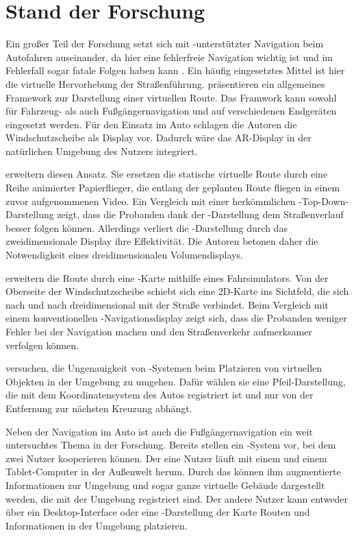 \chapter{Stand der Forschung}
\label{chap:related_work}
Ein großer Teil der Forschung setzt sich mit -unterstützter Navigation beim Autofahren auseinander, da hier eine fehlerfreie Navigation wichtig ist und im Fehlerfall sogar fatale Folgen haben kann \parencite{Lin2017}.
Ein häufig eingesetztes Mittel ist hier die virtuelle Hervorhebung der Straßenführung.
\textcite{Narzt2006} präsentieren ein allgemeines Framework zur Darstellung einer virtuellen Route.
Das Framwork kann sowohl für Fahrzeug- als auch Fußgängernavigation und auf verschiedenen Endgeräten eingesetzt werden.
Für den Einsatz im Auto schlagen die Autoren die Windschutzscheibe als Display vor.
Dadurch wäre das AR-Display in der natürlichen Umgebung des Nutzers integriert.

\textcite{Bark2014} erweitern diesen Ansatz.
Sie ersetzen die statische virtuelle Route durch eine Reihe animierter Papierflieger, die entlang der geplanten Route fliegen in einem zuvor aufgenommenen Video.
Ein Vergleich mit einer herkömmlichen -Top-Down-Darstellung zeigt, dass die Probanden dank der -Darstellung dem Straßenverlauf besser folgen können.
Allerdings verliert die -Darstellung durch das zweidimensionale Display ihre Effektivität.
Die Autoren betonen daher die Notwendigkeit eines dreidimensionalen Volumendisplays.

\textcite{Kim2009} erweitern die Route durch eine -Karte mithilfe eines Fahrsimulators.
Von der Oberseite der Windschutzscheibe schiebt sich eine 2D-Karte ins Sichtfeld, die sich nach und nach dreidimensional mit der Straße verbindet.
Beim Vergleich mit einem konventionellen -Navigationsdisplay zeigt sich, dass die Probanden weniger Fehler bei der Navigation machen und den Straßenverkehr aufmerksamer verfolgen können.

\cite{Wiesner2017} versuchen, die Ungenauigkeit von -Systemen beim Platzieren von virtuellen Objekten in der Umgebung zu umgehen.
Dafür wählen sie eine Pfeil-Darstellung, die mit dem Koordinatensystem des Autos registriert ist und nur von der Entfernung zur nächsten Kreuzung abhängt.

Neben der Navigation im Auto ist auch die Fußgängernavigation ein weit untersuchtes Thema in der Forschung.
Bereits \textcite{Hoellerer1999} stellen ein -System vor, bei dem zwei Nutzer kooperieren können.
Der eine Nutzer läuft mit einem  und einem Tablet-Computer in der Außenwelt herum.
Durch das  können ihm augmentierte Informationen zur Umgebung und sogar ganze virtuelle Gebäude dargestellt werden, die mit der Umgebung registriert sind.
Der andere Nutzer kann entweder über ein Desktop-Interface oder eine -Darstellung der Karte Routen und Informationen in der Umgebung platzieren.

